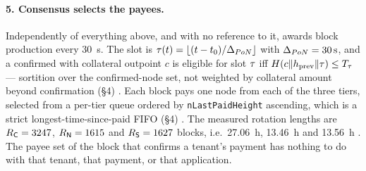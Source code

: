 \paragraph{5. Consensus selects the payees.}
Independently of everything above, and with no reference to it, \fluxd awards block production every
\SI{30}{\second}. The \PoN slot is $\tau(t) = \lfloor (t - t_0)/\Delta_{PoN} \rfloor$ with
$\Delta_{PoN} = \SI{30}{\second}$, and a confirmed \FluxNode with collateral outpoint $c$ is eligible
for slot $\tau$ iff $H(c \| h_{\mathrm{prev}} \| \tau) \le T_{\tau}$ --- sortition over the
confirmed-node set, not weighted by collateral amount beyond confirmation (\S4)
. Each block pays one node from each of the three tiers,
selected from a per-tier queue ordered by \texttt{n\allowbreak{}Last\allowbreak{}Paid\allowbreak{}Height} ascending, which is a strict
longest-time-since-paid FIFO (\S4) . The measured
rotation lengths are $R_{\mathsf{C}} = \num{3247}$, $R_{\mathsf{N}} = \num{1615}$ and $R_{\mathsf{S}} = \num{1627}$
blocks, i.e.\ \SI{27.06}{\hour}, \SI{13.46}{\hour} and \SI{13.56}{\hour}
. The payee set of the block that
confirms a tenant's payment has nothing to do with that tenant, that payment, or that application.

